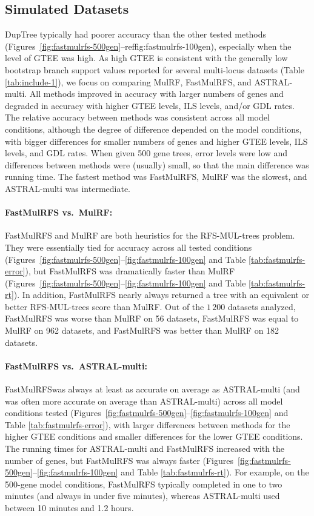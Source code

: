 \subsection{Simulated Datasets}
DupTree typically had poorer accuracy than the other tested methods (Figures~\ref{fig:fastmulrfs-500gen}--ref{fig:fastmulrfs-100gen}), especially when the level of GTEE was high.
As high GTEE is consistent with the generally low bootstrap branch support values reported for several multi-locus datasets (Table \ref{tab:include-1}), we focus on comparing MulRF, FastMulRFS, and ASTRAL-multi.
All methods improved in accuracy with larger numbers of genes and degraded in accuracy with higher GTEE levels, ILS levels, and/or GDL rates.
The relative accuracy between methods was consistent across all model conditions, although the degree of difference depended on the model conditions, with bigger differences for smaller numbers of genes and higher GTEE levels, ILS levels, and GDL rates.
When given 500 gene trees, error levels were low and differences between methods were (usually) small, so that the main difference was running time.
The fastest method was FastMulRFS, MulRF was the slowest, and ASTRAL-multi was intermediate.

\paragraph{FastMulRFS vs.~MulRF:}
FastMulRFS and MulRF are both heuristics for the RFS-MUL-trees problem.
They were essentially tied for accuracy across all tested conditions (Figures~\ref{fig:fastmulrfs-500gen}--\ref{fig:fastmulrfs-100gen} and Table \ref{tab:fastmulrfs-error}), but FastMulRFS was dramatically faster than MulRF (Figures~\ref{fig:fastmulrfs-500gen}--\ref{fig:fastmulrfs-100gen} and Table \ref{tab:fastmulrfs-rt}). In addition, FastMulRFS nearly always returned a tree with an equivalent or better RFS-MUL-trees score than MulRF. Out of the $1\,200$ datasets analyzed, FastMulRFS was worse than MulRF on 56 datasets, FastMulRFS was equal to MulRF on  962 datasets, and FastMulRFS was better than MulRF on 182 datasets.

\paragraph{FastMulRFS vs.~ASTRAL-multi:}
FastMulRFSwas always at least as accurate on average as ASTRAL-multi (and was often more accurate on average  than ASTRAL-multi) across all model conditions tested (Figures~\ref{fig:fastmulrfs-500gen}--\ref{fig:fastmulrfs-100gen} and Table \ref{tab:fastmulrfs-error}), with larger differences between methods for the higher GTEE conditions and smaller differences for the lower GTEE conditions.
The running times for ASTRAL-multi and FastMulRFS increased with the number of genes, but FastMulRFS was always faster (Figures~\ref{fig:fastmulrfs-500gen}--\ref{fig:fastmulrfs-100gen} and Table \ref{tab:fastmulrfs-rt}).
For example, on the 500-gene model conditions, FastMulRFS typically completed in one to two minutes (and always in under five minutes), whereas ASTRAL-multi used between 10 minutes and 1.2 hours.

